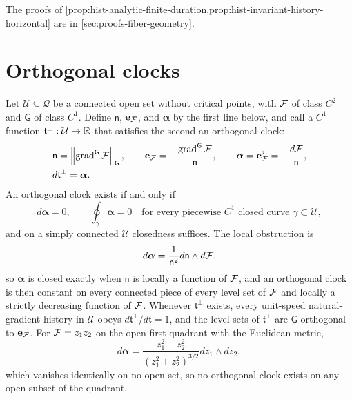 The proofs of \cref{prop:hist-analytic-finite-duration,prop:hist-invariant-history-horizontal}
are in \cref{sec:proofs-fiber-geometry}.

\section{Orthogonal clocks}
\label{sec:hist-global-clock}

Let $\mathcal U\subseteq\mathcal Q$ be a connected open set without critical points, with
$\mathcal F$ of class $C^2$ and $\mathsf G$ of class $C^1$.  Define $\mathsf n$,
$\mathbf e_{\mathcal F}$, and $\bm\alpha$ by the first line below, and call a $C^1$
function $\mathfrak t^\perp:\mathcal U\to\mathbb R$ that satisfies the second an orthogonal
clock:
\begin{align}
&\mathsf n=\left\|\operatorname{grad}^{\mathsf G}\mathcal F\right\|_{\mathsf G},
\qquad
\mathbf e_{\mathcal F}=-\frac{\operatorname{grad}^{\mathsf G}\mathcal F}{\mathsf n},
\qquad
\bm\alpha=\mathbf e_{\mathcal F}^\flat=-\frac{d\mathcal F}{\mathsf n},
\label{eq:hist-normalized-vfe-one-form}\\
&d\mathfrak t^\perp=\bm\alpha.
\label{eq:hist-global-clock-potential}
\end{align}
An orthogonal clock exists if and only if
\begin{equation}
d\bm\alpha=0,
\qquad
\oint_\gamma\bm\alpha=0
\quad\text{for every piecewise $C^1$ closed curve }\gamma\subset\mathcal U,
\label{eq:hist-global-clock-period-criterion}
\end{equation}
and on a simply connected $\mathcal U$ closedness suffices.  The local obstruction is
\begin{equation}
d\bm\alpha=\frac{1}{\mathsf n^2} d\mathsf n\wedge d\mathcal F,
\label{eq:hist-normalized-form-curvature}
\end{equation}
so $\bm\alpha$ is closed exactly when $\mathsf n$ is locally a function of $\mathcal F$,
and an orthogonal clock is then constant on every connected piece of every level set of
$\mathcal F$ and locally a strictly decreasing function of $\mathcal F$.  Whenever
$\mathfrak t^\perp$ exists, every unit-speed natural-gradient history in $\mathcal U$
obeys $d\mathfrak t^\perp/d\mathfrak t=1$, and the level sets of $\mathfrak t^\perp$ are
$\mathsf G$-orthogonal to $\mathbf e_{\mathcal F}$.  For $\mathcal F=z_1z_2$ on the open first
quadrant with the Euclidean metric,
\begin{equation}
d\bm\alpha
=\frac{z_1^2-z_2^2}{(z_1^2+z_2^2)^{3/2}} dz_1\wedge dz_2,
\label{eq:hist-nonexact-clock-example}
\end{equation}
which vanishes identically on no open set, so no orthogonal clock exists on any open
subset of the quadrant.  

